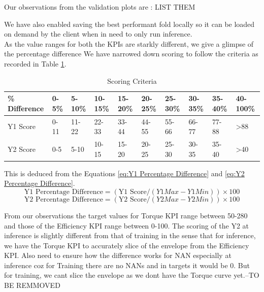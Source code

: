 \documentclass{report} %
\begin{document}
Our observations from the validation plots are : LIST THEM

We have also enabled saving the best performant fold locally so it can be loaded on demand by the client when in need to only run inference.\\
As the value ranges for both the \ac{KPI}s are starkly different, we give a glimpse of the percentage difference
We have narrowed down scoring to follow the criteria as recorded in Table \ref{tab:Scoring Criteria}.
\begin{table}[H]
    \centering
    \begin{tabularx}{1\linewidth}{|X|X|X|X|X|X|X|X|X|X|}
    \hline {\bf \% Difference} & {\bf 0-5\%} & {\bf 5-10\%} & {\bf 10-15\%} & {\bf 15-20\%} & {\bf 20-25\%} & {\bf 25-30\%} & {\bf 30-35\%} & {\bf 35-40\%} & {\bf 40-100\%}\\
    \hline 
    Y1 Score& 0-11& 11-22 & 22-33 & 33-44 & 44-55& 55-66 & 66-77 & 77-88 & \textgreater 88\\
    Y2 Score& 0-5 & 5-10 & 10-15 & 15-20 & 20-25& 25-30 & 30-35 & 35-40 &\textgreater 40\\
    \hline
    \end{tabularx}
    \caption{Scoring Criteria}
    \label{tab:Scoring Criteria}
\end{table}

This is deduced from the Equations \ref{eq:Y1 Percentage Difference} and \ref{eq:Y2 Percentage Difference}.
\begin{equation}
    \text{Y1 Percentage Difference} = (\text{Y1 Score} / {(Y1 Max - Y1 Min)})  \times 100
    \label{eq:Y1 Percentage Difference}
\end{equation}
\begin{equation}
    \text{Y2 Percentage Difference} = (\text{Y2 Score} / {(Y2 Max - Y2 Min)})  \times 100
    \label{eq:Y2 Percentage Difference}
\end{equation}

From our observations the target values for Torque \ac{KPI} range between 50-280 and those of the Efficiency \ac{KPI} range between 0-100.
The scoring of the Y2 at inference is slightly different from that of training in the sense that for inference, we have the Torque \ac{KPI} to 
accurately slice of the envelope from the Efficiency \ac{KPI}. Also need to ensure how the difference works for NAN especially at inference coz 
for Training there are no NANs and in targets it would be 0. But for training, we cant slice the envelope as we dont have the Torque curve yet.--TO BE REMMOVED
\end{document}
